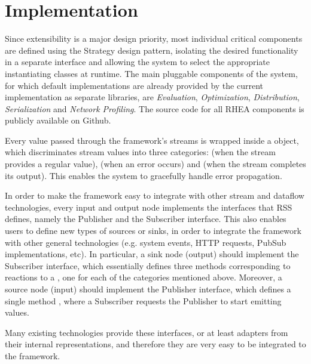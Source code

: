 \documentclass[sigplan,screen,10pt]{acmart}
\begin{document}
\section{Implementation} \label{sec:implementation}

Since extensibility is a major design priority, most individual critical
components are defined using the Strategy design pattern, isolating the desired
functionality in a separate interface and allowing the system to select the
appropriate instantiating classes at runtime. The main pluggable components of
the system, for which default implementations are already provided by the
current implementation as separate libraries, are \textit{Evaluation},
\textit{Optimization}, \textit{Distribution}, \textit{Serialization} and
\textit{Network Profiling}. The source code for all RHEA components
is publicly available on Github.

Every value passed through the framework's streams is wrapped inside a
 object, which discriminates stream values into three
categories:  (when the stream provides a regular value),
 (when an error occurs) and  (when the
stream completes its output). This enables the system to gracefully handle
error propagation.

In order to make the framework easy to integrate with other stream and
dataflow technologies, every input and output node implements the interfaces
that RSS defines, namely the Publisher and the Subscriber interface. This also
enables users to define new types of sources or sinks, in order to integrate
the framework with other general technologies (e.g. system events, HTTP requests,
PubSub implementations, etc).
%
In particular, a sink node (output) should implement the Subscriber interface, which
essentially defines three methods corresponding to reactions to a
, one for each of the categories mentioned above.
%
Moreover, a source node (input) should implement the Publisher interface, which defines a
single method , where a Subscriber requests the
Publisher to start emitting values.

Many existing technologies provide these interfaces, or at least adapters from
their internal representations, and therefore they are very easy to be
integrated to the framework.
\end{document}
